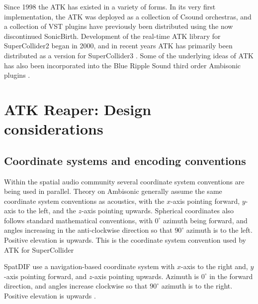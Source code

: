 \documentclass{article}
\begin{document}
Since 1998 the ATK has existed in a variety of forms.
In its very first implementation, the ATK was deployed as a collection of Csound orchestras, and a collection of VST plugins have previously been distributed using the now discontinued SonicBirth.
Development of the real-time ATK library for SuperCollider2 began in 2000, and in recent years ATK has primarily been distributed as a version for SuperCollider3 \cite{Anderson:2009introducingATK}.
Some of the underlying ideas of ATK has also been incorporated into the Blue Ripple Sound third order Ambisonic plugins \cite{blueripple:2014TOA}.




\section{ATK Reaper: Design considerations}\label{sec:design}

\subsection{Coordinate systems and encoding conventions}\label{sec:coordinate-systems}

Within the spatial audio community several coordinate system conventions are being used in parallel.
Theory on Ambisonic generally assume the same coordinate system conventions as acoustics, with the $x$-axis pointing forward, $y$-axis to the left, and the $z$-axis pointing upwards. 
Spherical coordinates also follows standard mathematical conventions, with $0^{\circ}$ azimuth being forward, and angles increasing in the anti-clockwise direction so that $90^{\circ}$ azimuth is to the left.
Positive elevation is upwards.
This is the coordinate system convention used by ATK for SuperCollider

SpatDIF use a navigation-based coordinate system with $x$-axis to the right and, $y$-axis pointing forward, and $z$-axis pointing upwards.
Azimuth is $0^{\circ}$ in the forward direction, and angles increase clockwise so that $90^{\circ}$ azimuth is to the right.
Positive elevation is upwards \cite{Peters:2013spatdif}.
\end{document}
